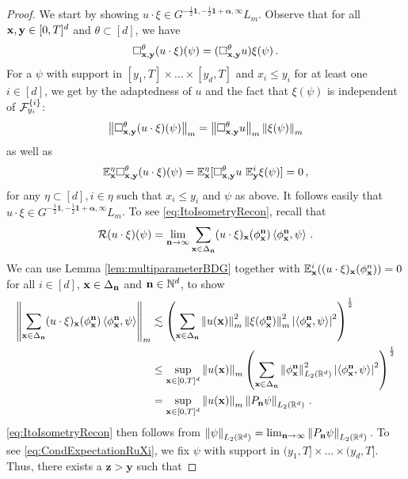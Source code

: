 \documentclass[12pt]{article}
\numberwithin{equation}{section}
\theoremstyle{plain}
\theoremstyle{definition}
\newcommand{\abs}[1]{\left\vert #1 \right\vert}
\newcommand{\scalar}[1]{\left\langle #1 \right\rangle}
\newcommand{\norm}[1]{\left\Vert #1\right\Vert}
\def\cR{\mathcal{R}}\def\cE{\mathcal{E}}
\def\bR{\mathbb{R}}\def\bS{\mathbb{S}}
\def\bE{\mathbb{E}}\def\bW{\mathbb{W}}
\def\fy{\mathbf y}\def\fz{\mathbf z}
\def\falpha{{\boldsymbol\alpha}}
\def\fone{{\boldsymbol 1}}
\begin{document}
\begin{proof}
    We start by showing $u\cdot\xi \in G^{-\frac 12\fone,-\frac 12\fone+\falpha, \infty}L_m$. Observe that for all $\fx,\fy\in[0,T]^d$ and $\theta\subset[d]$, we have
%
    \begin{equation*}
        \square_{\fx,\fy}^\theta (u\cdot \xi)(\psi) = (\square^\theta_{\fx,\fy} u)  \xi(\psi)\,.
    \end{equation*}
%
    For a $\psi$ with support in $[y_1,T]\times\dots\times[y_d,T]$ and $x_i\le y_i$ for at least one $i\in[d]$, we get by the adaptedness of $u$ and the fact that $\xi(\psi)$ is independent of $\mathcal{F}^{\{i\}}_{y_i}$:
%
    \begin{align*}
        \norm{\square_{\fx,\fy}^\theta (u\cdot \xi)(\psi)}_m = \norm{\square^\theta_{\fx,\fy} u}_m \norm{\xi(\psi)}_m
    \end{align*}
%
    as well as
    \[
        \bE^\eta_\fx \square^\theta_{\fx,\fy}(u\cdot\xi)(\psi) = \bE^\eta_\fx[\square_{\fx,\fy}^\theta u ~\bE^i_\fy \xi(\psi)] = 0\,,
    \]
    for any $\eta\subset[d], i\in\eta$ such that $x_i\le y_i$ and $\psi$ as above. It follows easily that $u\cdot\xi\in G^{-\frac 12\fone,-\frac 12\fone+\falpha,\infty}L_m$. To see \eqref{eq:ItoIsometryRecon}, recall that
%
    \begin{equation*}
        \cR(u\cdot\xi)(\psi) = \lim_{\fn\to\infty} \sum_{\fx\in\Delta_\fn} (u\cdot\xi)_\fx(\phi_\fx^\fn)\scalar{\phi^\fn_\fx,\psi}\,.
    \end{equation*}
%
    We can use Lemma \ref{lem:multiparameterBDG} together with $\bE^i_\fx((u\cdot\xi)_\fx(\phi_\fx^n)) = 0$ for all $i\in[d]$, $\mathbf x\in \Delta_\mathbf n$ and $\mathbf n\in\mathbb{N}^d$, to show
%
    \begin{align*}
        \norm{\sum_{\fx\in\Delta_\fn} (u\cdot\xi)_\fx(\phi_\fx^\fn)\scalar{\phi^\fn_\fx,\psi}}_m &\lesssim \left(\sum_{\fx\in\Delta_\fn} \norm{u(\fx)}_m^2 \norm{\xi(\phi_\fx^\fn)}_m^2\abs{\scalar{\phi^\fn_\fx,\psi}}^2\right)^{\frac 12} \\
        &\le \sup_{\fx\in[0,T]^d}\norm{u(\fx)}_m \left(\sum_{\fx\in\Delta_\fn}\norm{\phi_\fx^\fn}_{L_2(\bR^d)}^2\abs{\scalar{\phi^\fn_\fx,\psi}}^2\right)^{\frac 12} \\
        &= \sup_{\fx\in[0,T]^d}\norm{u(\fx)}_m \norm{P_\fn\psi}_{L_2(\bR^d)}\,.
    \end{align*}
%
    \eqref{eq:ItoIsometryRecon} then follows from $\norm{\psi}_{L_2(\bR^d)} = \lim_{\fn\to\infty} \norm{P_\fn \psi}_{L_2(\bR^d)}$\,. To see \eqref{eq:CondExpectationRuXi}, we fix  $\psi$ with support in $(y_1,T]\times\dots\times(y_d,T]$. Thus, there exists a $\fz>\fy$ such that

\end{proof}
\end{document}
